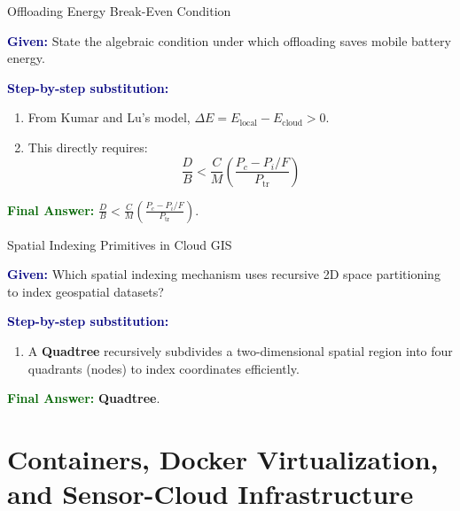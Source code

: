 \documentclass[11pt,a4paper,openany]{report}
\newcommand{\Given}{\par\textbf{\textcolor{navy}{Given:}} }
\newcommand{\Steps}{\par\textbf{\textcolor{navy}{Step-by-step substitution:}}\par}
\newcommand{\Answer}{\par\textbf{\textcolor{darkgreen}{Final Answer:}} }
\begin{document}
\begin{solved}{Offloading Energy Break-Even Condition}
\Given State the algebraic condition under which offloading saves mobile battery energy.
\Steps
\begin{enumerate}[leftmargin=*]
  \item From Kumar and Lu's model, $\Delta E = E_{\text{local}} - E_{\text{cloud}} > 0$.
  \item This directly requires:
  \begin{equation}
  \frac{D}{B} < \frac{C}{M} \left( \frac{P_c - P_i/F}{P_{\text{tr}}} \right)
  \end{equation}
\end{enumerate}
\Answer \textbf{$\frac{D}{B} < \frac{C}{M} \left( \frac{P_c - P_i/F}{P_{\text{tr}}} \right)$}.
\end{solved}

\begin{solved}{Spatial Indexing Primitives in Cloud GIS}
\Given Which spatial indexing mechanism uses recursive 2D space partitioning to index geospatial datasets?
\Steps
\begin{enumerate}[leftmargin=*]
  \item A \textbf{Quadtree} recursively subdivides a two-dimensional spatial region into four quadrants (nodes) to index coordinates efficiently.
\end{enumerate}
\Answer \textbf{Quadtree}.
\end{solved}

\chapter{Containers, Docker Virtualization, and Sensor-Cloud Infrastructure}
\end{document}
